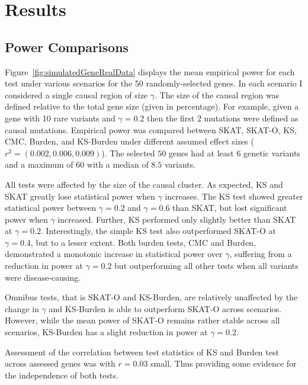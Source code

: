 \section{Results}
\label{sec:results}

\subsection{Power Comparisons}
\label{sub:power_comparisons}

Figure~\ref{fig:simulatedGeneRealData} displays the mean empirical power for each test under various scenarios for the 50 randomly-selected genes.
In each scenario I considered a single causal region of size $\gamma$.
The size of the causal region was defined relative to the total gene size (given in percentage).
For example, given a gene with 10 rare variants and $\gamma=0.2$ then the first $2$ mutations were defined as causal mutations.
Empirical power was compared between SKAT, SKAT-O, KS, CMC, Burden, and KS-Burden under different assumed effect sizes ($r^2=(0.002, 0.006, 0.009)$).
The selected $50$ genes had at least $6$ genetic variants and a maximum of $60$ with a median of $8.5$ variants.

All tests were affected by the size of the causal cluster.
As expected, KS and SKAT greatly lose statistical power when $\gamma$ increases.
The KS test showed greater statistical power between $\gamma=0.2$ and $\gamma=0.6$ than SKAT, but lost significant power when $\gamma$ increased.
Further, KS performed only slightly better than SKAT at $\gamma=0.2$.
Interestingly, the simple KS test also outperformed SKAT-O at $\gamma=0.4$, but to a lesser extent.
Both burden tests, CMC and Burden, demonstrated a monotonic increase in statistical power over $\gamma$,
 suffering from a reduction in power at $\gamma=0.2$ but outperforming all other tests when all variants were disease-causing.

Omnibus tests, that is SKAT-O and KS-Burden, are relatively unaffected by the change in $\gamma$ and KS-Burden is able to outperform SKAT-O across scenarios.
However, while the mean power of SKAT-O remains rather stable across all scenarios, KS-Burden has a slight reduction in power at $\gamma=0.2$.

Assessment of the correlation between test statistics of KS and Burden test across assessed genes was with $r=0.03$ small.
Thus providing some evidence for the independence of both tests. %

